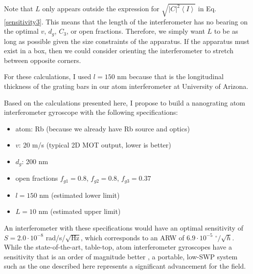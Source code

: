 \documentclass[twocolumn,pra,showpacs,superscriptaddress,longbibliography]{revtex4-1}   %
\newcommand{\avg}[1]{\left\langle #1 \right\rangle}
\begin{document}
Note that $L$ only appears outside the expression for $\sqrt{|C|^2\avg{I}}$ in Eq. \ref{sensitivity3}. This means that the length of the interferometer has no bearing on the optimal $v$, $d_g$, $C_3$, or open fractions. Therefore, we simply want $L$ to be as long as possible given the size constraints of the apparatus. If the apparatus must exist in a box, then we could consider orienting the interferometer to stretch between opposite corners. 

For these calculations, I used $l = 150$ nm because that is the longitudinal thickness of the grating bars in our atom interferometer at University of Arizona.

Based on the calculations presented here, I propose to build a nanograting atom interferometer gyroscope with the following specifications:
\begin{itemize}
	\item atom: Rb (because we already have Rb source and optics)
	\item $v$: 20 m/s (typical 2D MOT output, lower is better)
	\item $d_g$: 200 nm
	\item open fractions $f_{g1} = 0.8$, $f_{g2} = 0.8$, $f_{g3} = 0.37$ 
	\item $l=150$ nm (estimated lower limit)
	\item $L=10$ nm (estimated upper limit)
\end{itemize}
An interferometer with these specifications would have an optimal sensitivity of $S = 2.0\cdot10^{-8}$ rad/s/$\sqrt{\mathrm{Hz}}$, which corresponds to an ARW of $6.9\cdot10^{-5}$ $^{\circ}/\sqrt{h}$. While the state-of-the-art, table-top, atom interferometer gyroscopes have a sensitivity that is an order of magnitude better \cite{Durfee2006}, a portable, low-SWP system such as the one described here represents a significant advancement for the field.




\end{document}
